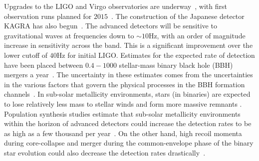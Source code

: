 \documentclass[aps,
prd,
twocolumn,
superscriptaddress,
lengthcheck,showpacs,letterpaper,nofootinbib,
floatfix]{revtex4-1}
\begin{document}
Upgrades to the LIGO and Virgo observatories are
underway~\cite{Harry:2010zz,aVIRGO}, with first observation runs planned for
$2015$~\cite{Aasi:2013wya}. The construction of the Japanese detector KAGRA 
has also begun~\cite{Somiya:2011np}. The advanced detectors will be
sensitive to gravitational waves at frequencies down to 
$\sim 10$Hz, with an order of magnitude increase in sensitivity across the
band. This is a significant improvement over the lower cutoff of $40$Hz
for initial LIGO. Estimates for the expected rate of detection have
been placed between $0.4 - 1000$ stellar-mass binary black hole (BBH)
mergers a year~\cite{LSCCBCRates2010}. 
The uncertainty in these estimates comes from the uncertainties in the various
factors that govern the physical processes in the BBH formation 
channels~\cite{1973NInfo..27...86T,1973NInfo..27...70T}. 
In sub-solar metallicity environments, stars (in binaries) are expected to 
lose relatively less mass to stellar winds and form more massive remnants 
\cite{Webbink:1984ti,Kowalska:2012bb,Fryer:2011cx}. 
Population synthesis studies estimate that sub-solar metallicity environments
within the horizon of advanced detectors could increase the detection rates 
to be as high
as a few thousand per year~\cite{Dominik:2012kk,Belczynski:2012cx}. 
On the other hand, high recoil momenta during core-collapse and 
merger during the common-envelope phase of the binary star evolution
could also decrease the detection 
rates drastically~\cite{Fryer:2011cx,Dominik:2012kk}. 

\end{document}
